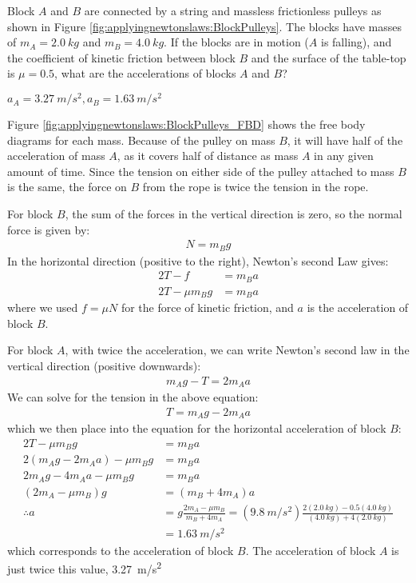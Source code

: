 \question Block $A$ and $B$ are connected by a string and massless frictionless pulleys as shown in Figure \ref{fig:applyingnewtonslaws:BlockPulleys}. The blocks have masses of $m_A=\SI{2.0}{kg}$ and $m_B=\SI{4.0}{kg}$. If the blocks are in motion ($A$ is falling), and the coefficient of kinetic friction between block $B$ and the surface of the table-top is $\mu=0.5$, what are the accelerations of blocks $A$ and $B$?
\begin{finalanswer}
$a_A=\SI{3.27}{m/s^2}, a_B=\SI{1.63}{m/s^2}$
\end{finalanswer}

\begin{solution}
Figure \ref{fig:applyingnewtonslaws:BlockPulleys_FBD} shows the free body diagrams for each mass. 
Because of the pulley on mass $B$, it will have half of the acceleration of mass $A$, as it covers half of distance as mass $A$ in any given amount of time. Since the tension on either side of the pulley attached to mass $B$ is the same, the force on $B$ from the rope is twice the tension in the rope. 

For block $B$, the sum of the forces in the vertical direction is zero, so the normal force is given by:
\begin{align*}
N=m_Bg
\end{align*}
In the horizontal direction (positive to the right), Newton's second Law gives:
\begin{align*}
2T-f&=m_Ba\\
2T-\mu m_Bg&=m_Ba
\end{align*}
where we used $f=\mu N$ for the force of kinetic friction, and $a$ is the acceleration of block $B$. 
 
For block $A$, with twice the acceleration, we can write Newton's second law in the vertical direction (positive downwards):
\begin{align*}
m_Ag-T=2m_Aa
\end{align*}
We can solve for the tension in the above equation:
\begin{align*}
T=m_Ag-2m_Aa
\end{align*}
which we then place into the equation for the horizontal acceleration of block $B$:
\begin{align*}
2T-\mu m_Bg&=m_Ba \\
2(m_Ag-2m_Aa)-\mu m_Bg&=m_Ba \\
2m_Ag-4m_Aa-\mu m_Bg&=m_Ba\\
(2m_A-\mu m_B)g &= (m_B+4m_A)a\\
\therefore a &=g \frac{2m_A-\mu m_B}{m_B+4m_A}=(\SI{9.8}{m/s^2}) \frac{2(\SI{2.0}{kg})-0.5(\SI{4.0}{kg})}{(\SI{4.0}{kg})+4(\SI{2.0}{kg})}\\
&=\SI{1.63}{m/s^2}
\end{align*}
which corresponds to the acceleration of block $B$. The acceleration of block $A$ is just twice this value, \SI{3.27}{m/s^2}


\end{solution}

